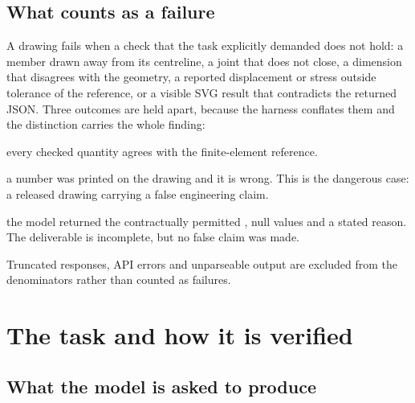 \documentclass[11pt,a4paper]{article}
\newcommand{\code}[1]{\path{#1}}
\begin{document}
\subsection{What counts as a failure}

A drawing fails when a check that the task explicitly demanded does not hold: a member drawn away from
its centreline, a joint that does not close, a dimension that disagrees with the geometry, a reported
displacement or stress outside tolerance of the reference, or a visible SVG result that contradicts the
returned JSON. Three outcomes are held apart, because the harness conflates them and the distinction
carries the whole finding:

\begin{description}[leftmargin=2.2em,style=nextline]
\item[computed, within tolerance] every checked quantity agrees with the finite-element reference.
\item[computed, outside tolerance] a number was printed on the drawing and it is wrong. This is the
      dangerous case: a released drawing carrying a false engineering claim.
\item[declined] the model returned the contractually permitted \code{status: "unavailable"}, null
      values and a stated reason. The deliverable is incomplete, but no false claim was made.
\end{description}

Truncated responses, API errors and unparseable output are excluded from the denominators rather than
counted as failures.

\section{The task and how it is verified}

\subsection{What the model is asked to produce}
\end{document}

